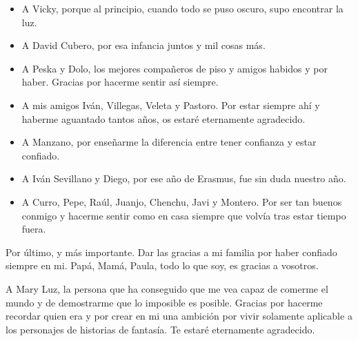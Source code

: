 \begin{itemize}
    \item A Vicky, porque al principio, cuando todo se puso oscuro, supo encontrar la luz.
    \item A David Cubero, por esa infancia juntos y mil cosas más.
    \item A Peska y Dolo, los mejores compañeros de piso y amigos habidos y por haber. Gracias por hacerme sentir así siempre.
    \item A mis amigos Iván, Villegas, Veleta y Pastoro. Por estar siempre ahí y haberme aguantado tantos años, os estaré eternamente agradecido.
    \item A Manzano, por enseñarme la diferencia entre tener confianza y estar confiado.
    \item A Iván Sevillano y Diego, por ese año de Erasmus, fue sin duda nuestro año.
    \item A  Curro, Pepe, Raúl, Juanjo, Chenchu, Javi y Montero. Por ser tan buenos conmigo y hacerme sentir como en casa siempre que volvía tras estar tiempo fuera. 
\end{itemize}

Por último, y más importante. Dar las gracias a mi familia por haber confiado siempre en mi. Papá, Mamá, Paula, todo lo que soy, es gracias a vosotros.

A Mary Luz, la persona que ha conseguido que me vea capaz de comerme el mundo y de demostrarme que lo imposible es posible. Gracias por hacerme recordar quien era y por crear en mi una ambición por vivir solamente aplicable a los personajes de historias de fantasía. Te estaré eternamente agradecido.